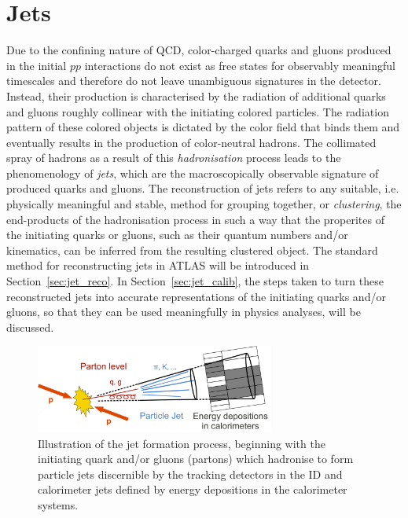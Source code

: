 \section{Jets}
\label{sec:jets}

Due to the confining nature of QCD, color-charged quarks and gluons produced in the
initial $pp$ interactions do not exist as free states for observably meaningful
timescales and therefore do not leave unambiguous signatures in the detector.
Instead, their production is characterised by the radiation of additional
quarks and gluons roughly collinear with the initiating colored particles.
The radiation pattern of these colored objects is dictated by the color field
that binds them and eventually results in the production of color-neutral hadrons.
The collimated spray of hadrons as a result of this \textit{hadronisation} process
leads to the phenomenology of \textit{jets}, which are the macroscopically observable signature
of produced quarks and gluons.
The reconstruction of jets refers to any suitable, i.e. physically meaningful and stable,
method for grouping together, or \textit{clustering}, the end-products of the hadronisation
process in such a way that the properites of the initiating quarks or gluons, such
as their quantum numbers and/or kinematics, can be inferred from the resulting clustered object.
The standard method for reconstructing jets in ATLAS will be introduced in Section~\ref{sec:jet_reco}.
In Section~\ref{sec:jet_calib}, the steps taken to turn these reconstructed jets into
accurate representations of the initiating quarks and/or gluons, so that they can
be used meaningfully in physics analyses, will be discussed.

\begin{figure}[!htb]
    \begin{center}
        \includegraphics[width=0.7\textwidth]{figures/chapter3/jets/jet_formation_cartoon}
        \caption{
            Illustration of the jet formation process, beginning with the initiating quark and/or
            gluons (partons) which hadronise to form particle jets discernible by the tracking detectors
            in the ID and calorimeter jets defined by energy depositions in the calorimeter systems.
        }
        \label{fig:jet_formation}
    \end{center}
\end{figure}


